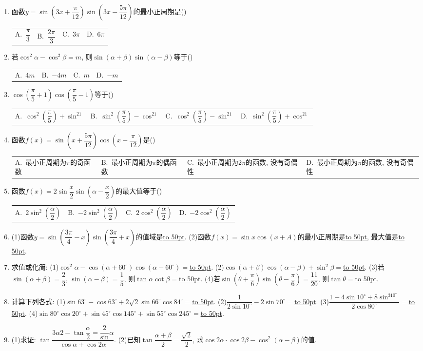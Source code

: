 \documentclass[10pt,a4paper]{article}
\newcommand{\blank}[1]{\underline{\hbox to #1pt{}}}
\newcommand{\fourch}[4]{\par\begin{tabular}{p{.23\textwidth}p{.23\textwidth}p{.23\textwidth}p{.23\textwidth}}
A.~#1 &B.~#2& C.~#3& D.~#4
\end{tabular}}
\begin{document}
\begin{enumerate}[1.]
解  ∵$\sin ^2\alpha +\sin ^2\beta =\dfrac{1-\cos 2\alpha}2+\dfrac{1-\cos 2\beta}2=1-\dfrac 12(\cos 2\alpha +\cos 2\beta)$
\blank{50}$=1-\cos (\alpha +\beta)\cos (\alpha -\beta)=1+\dfrac 12\cos (\alpha -\beta)$,
又$=-1\le \cos (\alpha -\beta)\le 1$, ∴$\sin ^2\alpha +\sin ^2\beta$的取值范围是$[\dfrac 12,\dfrac 32]$.
【训练题】
(一)积化和差公式
\item 函数$y=\sin (3x+\dfrac{\pi}{12})\sin (3x-\dfrac{5\pi}{12})$的最小正周期是()
\fourch{$\dfrac{\pi}3$}{$\dfrac{2\pi}3$}{$3\pi$}{$6\pi$}
\item 若$\cos ^2\alpha -\cos ^2\beta =m$, 则$\sin (\alpha +\beta)\sin (\alpha -\beta)$等于()
\fourch{$4m$}{$-4m$}{$m$}{$-m$}
\item $\cos (\dfrac{\pi}5+1)\cos (\dfrac{\pi}5-1)$等于()
\fourch{$\cos ^2(\dfrac{\pi}5)+\sin ^21$}{$\sin ^2(\dfrac{\pi}5)-\cos ^21$}{$\cos ^2(\dfrac{\pi}5)-\sin ^21$}{$\sin ^2(\dfrac{\pi}5)+\cos ^21$}
\item 函数$f(x)=\sin (x+\dfrac{5\pi}{12})\cos (x-\dfrac{\pi}{12})$是()
\fourch{最小正周期为$\pi$的奇函数}{最小正周期为$\pi$的偶函数}{最小正周期为$2\pi$的函数, 没有奇偶性}{最小正周期为$\pi$的函数, 没有奇偶性}
\item 函数$f(x)=2\sin \dfrac x2\sin (\alpha -\dfrac x2)$的最大值等于()
\fourch{$2\sin ^2(\dfrac{\alpha}2)$}{$-2\sin ^2(\dfrac{\alpha}2)$}{$2\cos ^2(\dfrac{\alpha}2)$}{$-2\cos ^2(\dfrac{\alpha}2)$}
\item (1)函数$y=\sin (\dfrac{3\pi}4-x)\sin (\dfrac{3\pi}4+x)$的值域是\blank{50}.
(2)函数$f(x)=\sin x\cos (x+A)$的最小正周期是\blank{50}, 最大值是\blank{50}.
\item 求值或化简:
(1)$\cos ^2\alpha -\cos (\alpha +60^{\circ})\cos (\alpha -60^{\circ})=$\blank{50}.
(2)$\cos (\alpha +\beta)\cos (\alpha -\beta)+\sin ^2\beta =$\blank{50}.
(3)若$\sin (\alpha +\beta)=\dfrac 23$, $\sin (\alpha -\beta)=\dfrac 15$, 则$\tan \alpha \cot \beta =$\blank{50}.
(4)若$\sin (\theta +\dfrac\pi 6)\sin (\theta -\dfrac{\pi}6)=\dfrac {11}{20}$, 则$\tan \theta =$\blank{50}.
\item 计算下列各式:
(1)$\sin 63^\circ -\cos 63^\circ +2\sqrt 2\sin 66^\circ \cos 84^\circ =$\blank{50}.
(2)$\dfrac 1{2\sin 10^\circ}-2\sin 70^\circ =$\blank{50}.
(3)$\dfrac{1-4\sin 10^\circ +8\sin ^310^\circ}{2\cos 80^\circ}=$\blank{50}.
(4)$\sin 80^\circ \cos 20^\circ +\sin 45^\circ \cos 145^\circ +\sin 55^\circ \cos 245^\circ =$\blank{50}.
\item (1)求证: $\tan \dfrac{3\alpha 2-\tan \dfrac{\alpha}2=\dfrac 2\sin \alpha}{\cos \alpha +\cos 2\alpha}$.
(2)已知$\tan \dfrac{\alpha +\beta}2=\dfrac{\sqrt 2}2$, 求$\cos 2\alpha \cdot \cos 2\beta -\cos ^2(\alpha -\beta)$的值.

\end{enumerate}
\end{document}
